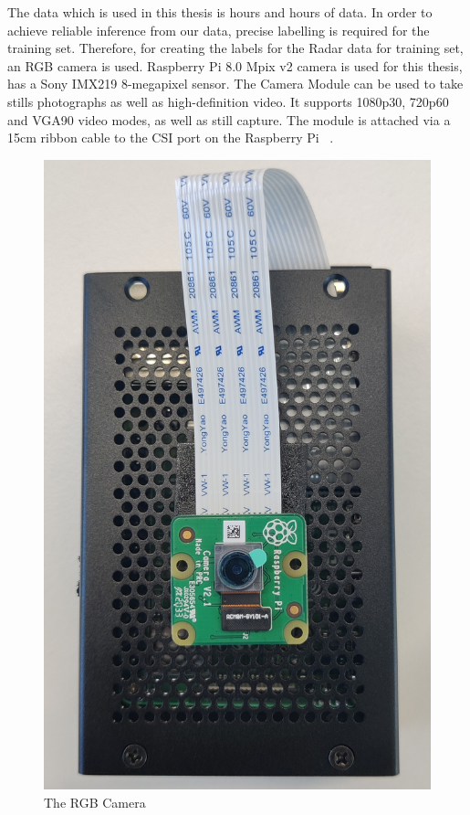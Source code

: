 The data which is used in this thesis is hours and hours of data. In order to achieve reliable inference from our data, precise labelling is required for the training set. Therefore, for creating the labels for the Radar data for training set, an RGB camera is used. Raspberry Pi 8.0 Mpix v2 camera is used for this thesis, has a Sony IMX219 8-megapixel sensor. The Camera Module can be used to take stills photographs as well as high-definition video. It supports 1080p30, 720p60 and VGA90 video modes, as well as still capture. The module is attached via a 15cm ribbon cable to the CSI port on the Raspberry Pi ~\cite{raspberrypi}.
\begin{figure}[ht]
  \begin{center}
    \includegraphics[scale = 0.07]{Master's thesis/images/RGB_camera.jpg} 
    \caption{The RGB Camera}
    \label{fig:AoA}
  \end{center}
\end{figure}  
